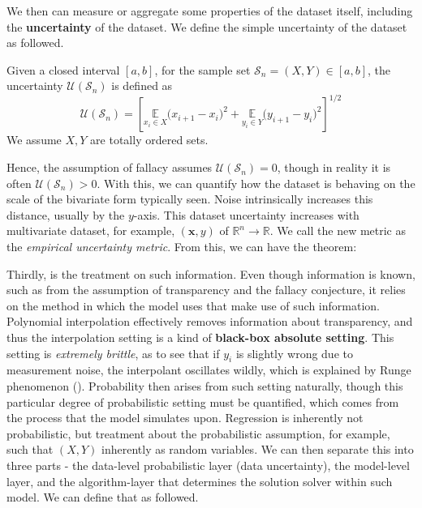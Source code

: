 \documentclass[10pt]{article} %
\begin{document}
We then can measure or aggregate some properties of the dataset itself, including the \textbf{uncertainty} of the dataset. We define the simple uncertainty of the dataset as followed. 

\begin{definition}
    Given a closed interval $[a,b]$, for the sample set $\mathcal{S}_{n}=(X,Y)\in [a,b]$, the uncertainty $\mathcal{U}(\mathcal{S}_{n})$ is defined as 
    \begin{equation}
        \mathcal{U}(\mathcal{S}_{n}) = \left[ \underset{x_{i}\in X}{\mathbb{E}}\Big( x_{i+1} - x_{i} \Big)^{2} + \underset{y_{i}\in Y}{\mathbb{E}} \Big( y_{i+1}- y_{i} \Big)^{2} \right]^{1/2}
    \end{equation}
    We assume $X,Y$ are totally ordered sets. 
\end{definition}
Hence, the assumption of fallacy assumes $\mathcal{U}(\mathcal{S}_{n})=0$, though in reality it is often $\mathcal{U}(\mathcal{S}_{n})>0$. With this, we can quantify how the dataset is behaving on the scale of the bivariate form typically seen. Noise intrinsically increases this distance, usually by the $y$-axis. This dataset uncertainty increases with multivariate dataset, for example, $(\mathbf{x},y)$ of $\mathbb{R}^{n}\to\mathbb{R}$. We call the new metric as the \textit{empirical uncertainty metric}. From this, we can have the theorem:

\begin{theorem}
    
\end{theorem}

Thirdly, is the treatment on such information. Even though information is known, such as from the assumption of transparency and the fallacy conjecture, it relies on the method in which the model uses that make use of such information. Polynomial interpolation effectively removes information about transparency, and thus the interpolation setting is a kind of \textbf{black-box absolute setting}. This setting is \textit{extremely brittle}, as to see that if $y_{i}$ is slightly wrong due to measurement noise, the interpolant oscillates wildly, which is explained by Runge phenomenon (\cite{Runge1901,CorlessSevyeri2018,AMC2009RungeDivergence}). Probability then arises from such setting naturally, though this particular degree of probabilistic setting must be quantified, which comes from the process that the model simulates upon. Regression is inherently not probabilistic, but treatment about the probabilistic assumption, for example, such that $(X,Y)$ inherently as random variables. We can then separate this into three parts - the data-level probabilistic layer (data uncertainty), the model-level layer, and the algorithm-layer that determines the solution solver within such model. We can define that as followed. 
\end{document}
